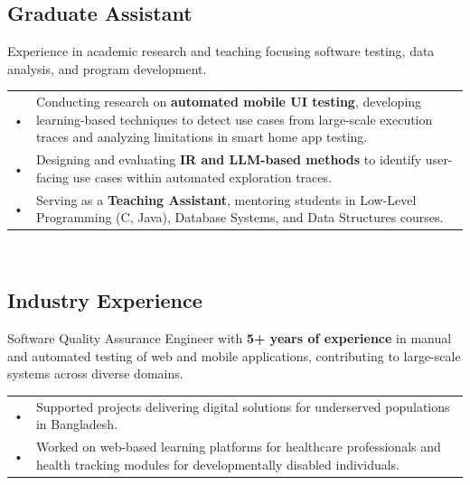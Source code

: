 \documentclass[a4paper]{MagicalCV}
\begin{document}
\begin{minipage}[t]{0.66\textwidth}
\sectionsep

\subsection{Graduate Assistant}
Experience in academic research and teaching focusing software testing, data analysis, and program development.

\begin{tabular}{@{}p{0.02cm}p{11cm}@{}}  
• & Conducting research on \textbf{automated mobile UI testing}, developing learning-based techniques to detect use cases from large-scale execution traces and analyzing limitations in smart home app testing. \\
• & Designing and evaluating \textbf{IR and LLM-based methods} to identify user-facing use cases within automated exploration traces. \\
• & Serving as a \textbf{Teaching Assistant}, mentoring students in Low-Level Programming (C, Java), Database Systems, and Data Structures courses. \\
\end{tabular} \\
\sectionsep


\subsection{Industry Experience}




Software Quality Assurance Engineer with \textbf{5+ years of experience} in manual and automated testing of web and mobile applications, contributing to large-scale systems across diverse domains.

\begin{tabular}{@{}p{0.02cm}p{11cm}@{}}  
• & Supported projects delivering digital solutions for underserved populations in Bangladesh. \\
• & Worked on web-based learning platforms for healthcare professionals and health tracking modules for developmentally disabled individuals. \\
\end{tabular}

\vspace{\topsep}
\sectionsep


\end{minipage} 
\end{document}
